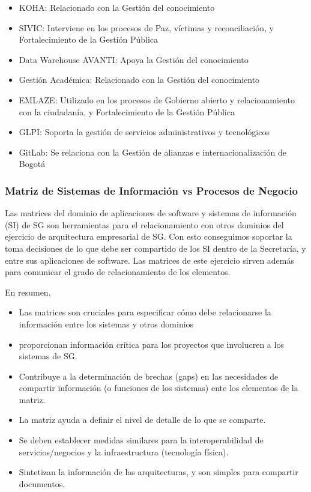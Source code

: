 \documentclass[
	a4paper, %
	12pt, %
]{include/CSSullivanBusinessReport}
\def\tightlist{}
\begin{document}
\begin{itemize}
  relacionamiento con la ciudadanía, y Fortalecimiento de la Gestión
  Pública
\item
  KOHA: Relacionado con la Gestión del conocimiento
\item
  SIVIC: Interviene en los procesos de Paz, víctimas y reconciliación, y
  Fortalecimiento de la Gestión Pública
\item
  Data Warehouse AVANTI: Apoya la Gestión del conocimiento
\item
  Gestión Académica: Relacionado con la Gestión del conocimiento
\item
  EMLAZE: Utilizado en los procesos de Gobierno abierto y
  relacionamiento con la ciudadanía, y Fortalecimiento de la Gestión
  Pública
\item
  GLPI: Soporta la gestión de servicios administrativos y tecnológicos
\item
  GitLab: Se relaciona con la Gestión de alianzas e internacionalización
  de Bogotá
\end{itemize}

\subsubsection{Matriz de Sistemas de Información vs Procesos de
Negocio}\label{sec:matriz-de-sistemas-de-informaciuxf3n-vs-procesos-de-negocio}

Las matrices del dominio de aplicaciones de software y sistemas de
información (SI) de SG son herramientas para el relacionamiento con
otros dominios del ejercicio de arquitectura empresarial de SG. Con esto
conseguimos soportar la toma decisiones de lo que debe ser compartido de
los SI dentro de la Secretaría, y entre sus aplicaciones de software.
Las matrices de este ejercicio sirven además para comunicar el grado de
relacionamiento de los elementos.

En resumen,

\begin{itemize}
\tightlist
\item
  Las matrices son cruciales para especificar cómo debe relacionarse la
  información entre los sistemas y otros dominios
\item
  proporcionan información crítica para los proyectos que involucren a
  los sistemas de SG.
\item
  Contribuye a la determinación de brechas (gaps) en las necesidades de
  compartir información (o funciones de los sistemas) ente los elementos
  de la matriz.
\item
  La matriz ayuda a definir el nivel de detalle de lo que se comparte.
\item
  Se deben establecer medidas similares para la interoperabilidad de
  servicios/negocios y la infraestructura (tecnología física).
\item
  Sintetizan la información de las arquitecturas, y son simples para
  compartir documentos.
\end{itemize}
\end{document}
